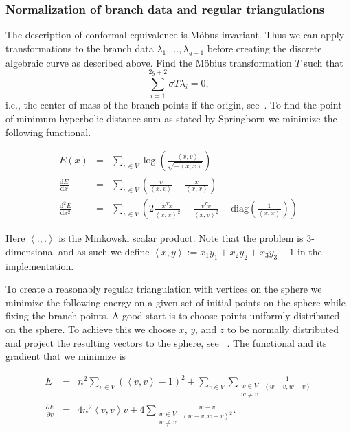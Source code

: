 \documentclass[Thesis.tex]{subfiles}
\begin{document}
\subsubsection{Normalization of branch data and regular triangulations}
The description of conformal equivalence is M{\"o}bus invariant. Thus we can apply transformations to the branch data $\lambda_1,\ldots,\lambda_{g+1}$ before creating the discrete algebraic curve as described above. Find the M{\"o}bius transformation $T$ such that
\[\sum_{i=1}^{2g+2}\sigma T \lambda_i = 0,\]
i.e., the center of mass of the branch points if the origin, see~\cite{Springborn05}.
To find the point of minimum hyperbolic distance sum as stated by Springborn we minimize the following functional. 

\begin{eqnarray*} 
	E(x) &=& \sum_{v\in V}\log\left(\frac{-\left<x,v\right>}{\sqrt{-\left<x,x\right>}}\right)\\
	\frac{\mathrm d E}{\mathrm dx} &=& \sum_{v\in V}\left(\frac{v}{\left<x,v\right>} - \frac{x}{\left<x,x\right>}\right)\\
	\frac{\mathrm d^2 E}{\mathrm dx^2} &=& \sum_{v\in V}\left(2\frac{x^Tx}{\left<x,x\right>^2}-\frac{v^Tv}{\left<x,v\right>^2} - \mathrm{diag}\left(\frac{1}{\left<x,x\right>}\right)\right)
\end{eqnarray*}

Here $\left<.,.\right>$ is the Minkowski scalar product. Note that the problem is
 $3$-dimensional and as such we define $\left<x,y\right>:=x_1y_1+x_2y_2+x_3y_3-1$ in
the implementation.

To create a reasonably regular triangulation with vertices on the sphere we minimize the following energy on a given set of initial points on the sphere while fixing the branch points. 
A good start is to choose points uniformly distributed on the sphere. 
To achieve this we choose $x$, $y$, and $z$ to be normally distributed and project the resulting vectors to the sphere, see~ \cite{Muller1959}. 
The functional and its gradient that we minimize is

\begin{eqnarray*}
	E &=& n^2\sum_{v\in V}\left( \left<v,v\right> - 1\right)^2 + \sum_{v\in
V}\sum_{\substack{w\in V\\w\neq v}} \frac{1}{\left<w-v, w-v\right>}\\ \frac{\partial
E}{\partial v} &=& 4n^2\left<v,v\right>v + 4\sum_{\substack{w\in V\\w\neq
v}}\frac{w-v}{\left<w-v,w-v\right>^2}.  \end{eqnarray*}
\end{document}
